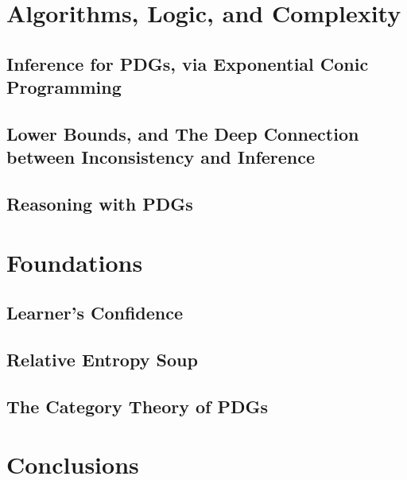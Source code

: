 \documentclass[tocprelim,
    ]{cornellmodified}
\begin{document}
\part{Algorithms, Logic, and Complexity%
    } \label{part:algo-logic-complexity}

\chapter{Inference for PDGs, via Exponential Conic Programming}
    

\chapter[Lower Bounds, and the Deep Connection\texorpdfstring{\\}{}between Inconsistency and Inference]%
    {Lower Bounds, and The Deep Connection between Inconsistency and Inference}
    

\chapter{Reasoning with PDGs}
    \label{chap:reason}


\part{Foundations} \label{part:foundations}

\chapter{Learner's Confidence}
    \label{chap:conf}

\chapter{Relative Entropy Soup}
    \label{chap:relent-soup}

\chapter{The Category Theory of PDGs}
    \label{chap:PDG-cat}

\part{Conclusions}  \label{part:conclusions}
\chapter{}
    
    


% 
% 

\end{document}
